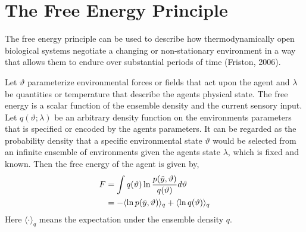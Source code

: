 \documentclass{article}
\begin{document}
\section{The Free Energy Principle}

The free energy principle can be used to describe how thermodynamically open biological systems negotiate a changing or non-stationary environment in a way that allows them to endure over substantial periods of time (Friston, 2006).

Let $\vartheta$ parameterize environmental forces or fields that act upon the agent and $\lambda$ be quantities or temperature that describe the agents physical state. The free energy is a scalar function of the ensemble density and the current sensory input. Let $q(\vartheta ;\lambda)$ be an arbitrary density function on the environments parameters that is specified or encoded by the agents parameters. It can be regarded as the probability density that a specific environmental state $\vartheta$ would be selected from an infinite ensemble of environments given the agents state $\lambda$, which is fixed and known. Then the free energy of the agent is given by, 
\begin{align}\label{eq:free-energy-1}
\begin{split} 
    F &= \int q(\vartheta) \ln \frac{p(\Tilde{y},\vartheta)}{q(\vartheta)} d\vartheta \\
    &= - \langle \ln p(\Tilde{y},\vartheta) \rangle_q + \langle \ln q(\vartheta) \rangle_q
\end{split}
\end{align}
Here $\langle \cdot \rangle_q$ means the expectation under the ensemble density $q$.



\end{document}
